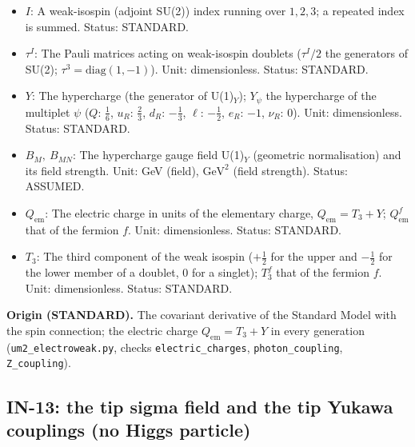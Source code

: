 \documentclass[
  10pt,
]{article}
\begin{document}
\begin{itemize}
  indices the components along the observable directions. Unit: GeV
  (field), \(\mathrm{GeV}^{2}\) (field strength). Status: ASSUMED.
\item
  \(I\): A weak-isospin (adjoint SU(2)) index running over \(1, 2, 3\);
  a repeated index is summed. Status: STANDARD.
\item
  \(\tau^I\): The Pauli matrices acting on weak-isospin doublets
  (\(\tau^I/2\) the generators of SU(2);
  \(\tau^3 = \mathrm{diag}(1, -1)\)). Unit: dimensionless. Status:
  STANDARD.
\item
  \(Y\): The hypercharge (the generator of U(1)\(_Y\)); \(Y_\psi\) the
  hypercharge of the multiplet \(\psi\) (\(Q\): \(\frac16\), \(u_R\):
  \(\frac23\), \(d_R\): \(-\frac13\), \(\ell\): \(-\frac12\), \(e_R\):
  \(-1\), \(\nu_R\): 0). Unit: dimensionless. Status: STANDARD.
\item
  \(B_M,\ B_{MN}\): The hypercharge gauge field U(1)\(_Y\) (geometric
  normalisation) and its field strength. Unit: GeV (field),
  \(\mathrm{GeV}^{2}\) (field strength). Status: ASSUMED.
\item
  \(Q_{\mathrm{em}}\): The electric charge in units of the elementary
  charge, \(Q_{\mathrm{em}} = T_3 + Y\); \(Q^f_{\mathrm{em}}\) that of
  the fermion \(f\). Unit: dimensionless. Status: STANDARD.
\item
  \(T_3\): The third component of the weak isospin (\(+\frac12\) for the
  upper and \(-\frac12\) for the lower member of a doublet, 0 for a
  singlet); \(T_3^f\) that of the fermion \(f\). Unit: dimensionless.
  Status: STANDARD.
\end{itemize}

\textbf{Origin (STANDARD).} The covariant derivative of the Standard
Model with the spin connection; the electric charge
\(Q_{\mathrm{em}} = T_3 + Y\) in every generation
(\texttt{um2\_electroweak.py}, checks \texttt{electric\_charges},
\texttt{photon\_coupling}, \texttt{Z\_coupling}).

\hypertarget{in-13-the-tip-sigma-field-and-the-tip-yukawa-couplings-no-higgs-particle}{%
\subsection{IN-13: the tip sigma field and the tip Yukawa couplings (no
Higgs
particle)}\label{in-13-the-tip-sigma-field-and-the-tip-yukawa-couplings-no-higgs-particle}}
\end{document}
